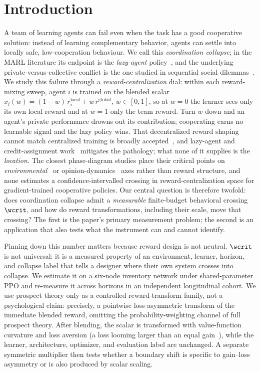 \section{Introduction}
\label{sec:intro}

A team of learning agents can fail even when the task has a good cooperative solution: instead of
learning complementary behavior, agents can settle into locally safe, low-cooperation behaviour.
We call this \emph{coordination collapse};
in the MARL literature its endpoint is the \emph{lazy-agent}
policy~\citep{liu2023lazy,peng2023curo}, and the underlying private-versus-collective conflict is
the one studied in sequential social dilemmas~\citep{leibo2017multi}. We study this failure through
a \emph{reward-centralization} dial: within each reward-mixing sweep, agent $i$ is trained on the
blended scalar $x_i(w)=(1-w)\,r_i^{\mathrm{local}}+w\,r^{\mathrm{global}}$, $w\in[0,\allowbreak 1]$, so at
$w{=}0$ the learner sees only its own local reward and at $w{=}1$ only the team reward. Turn $w$
down and an agent's private performance drowns out its contribution; cooperating earns no
learnable signal and the lazy policy wins. That decentralized reward shaping cannot match
centralized training is broadly accepted~\citep{dmarl2025}, and lazy-agent and credit-assignment
work~\citep{liu2023lazy,peng2023curo,sunehag2018vdn,rashid2018qmix,foerster2018counterfactual}
mitigates the pathology; what none of it supplies is the \emph{location}. The closest phase-diagram
studies place their critical points on \emph{environmental}~\citep{yamaguchi2025} or
opinion-dynamics~\citep{capannoli2026phase} axes rather than reward structure, and none estimates a
confidence-intervalled crossing in reward-centralization space for gradient-trained cooperative
policies. Our central question is therefore twofold: does coordination collapse admit a
\emph{measurable} finite-budget behavioral crossing $\wcrit$, and how do reward transformations,
including their scale, move that crossing? The first is the paper's primary measurement problem;
the second is an application that also tests what the instrument can and cannot identify.

Pinning down this number matters because reward design is not neutral. $\wcrit$ is not universal: it
is a measured property of an environment, learner, horizon, and collapse label that tells a designer
where their own system crosses into collapse. We estimate it on a six-node inventory network under
shared-parameter PPO and re-measure it across horizons in an independent longitudinal cohort. We use
prospect theory only as a controlled
reward-transform family, not a psychological claim: precisely, a pointwise loss-asymmetric transform
of the immediate blended reward, omitting the probability-weighting channel of full prospect
theory. After blending, the scalar is transformed with value-function curvature and loss aversion (a
loss looming larger than an equal gain~\citep{kahneman1979,tversky1992}), while the learner,
architecture, optimizer, and evaluation label are unchanged. A separate symmetric multiplier then
tests whether a boundary shift is specific to gain--loss asymmetry or is also produced by scalar scaling.

